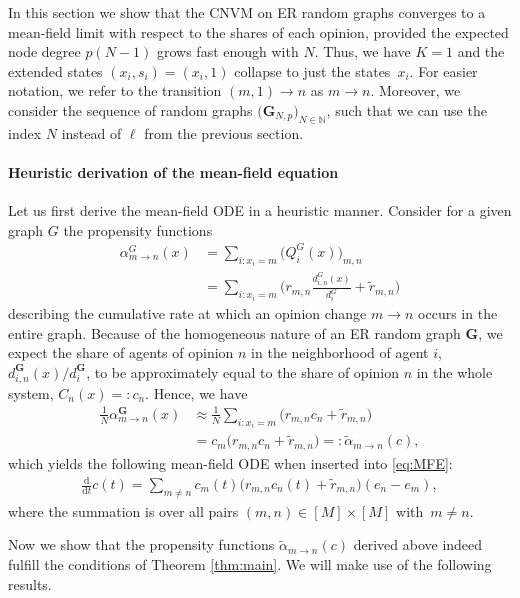 \documentclass[a4paper,
               10pt,
               pdftex,
               normalheadings,
               headsepline,
               footsepline,
               headinclude,
               footinclude,
               DIV=14,
               abstracton]
{scrartcl}
\newcommand{\rv}[1]{\bm{#1}}
\newcommand{\diff}{\mathrm{d}}
\newcommand{\review}[1]{{#1}}
\begin{document}
In this section we show that the CNVM on ER random graphs converges to a mean-field limit with respect to the shares of each opinion, provided the expected node degree $p(N-1)$ grows fast enough with $N$.
Thus, we have $K=1$ and the extended states $(x_i, s_i) = (x_i, 1)$ collapse to just the states~$x_i$.
For easier notation, we refer to the transition $(m, 1) \to n$ as $m \to n$.
Moreover, we consider the sequence of random graphs $\big(\rv{G}_{N,p}\big)_{N\in\mathbb{N}}$, such that we can use the index $N$ instead of $\ell$ from the previous section.

\paragraph{Heuristic derivation of the mean-field equation}
Let us first derive the mean-field ODE in a heuristic manner. Consider for a given graph $G$ the propensity functions
\begin{align}
    \alpha^{G}_{m\to n}(x) &= \sum_{i: x_i = m} \big(Q_i^{{G}}(x)\big)_{m, n} \\
    &= \sum_{i: x_i = m} \Big( r_{m, n}  \frac{d_{i,n}^{G}(x)}{d_{i}^{G}} + \tilde{r}_{m,n} \Big)\label{eq:cnvm_propensity}
\end{align}
\review{describing the cumulative rate at which an opinion change $m\to n$ occurs in the entire graph.}
Because of the homogeneous nature of an ER random graph $\rv{G}$, we expect the share of agents of opinion $n$ in the neighborhood of agent $i$, $d_{i,n}^{\rv{G}}(x) / d_{i}^{\rv{G}}$, to be approximately equal to the share of opinion $n$ in the whole system, $C_n(x) =: c_n$.
Hence, we have
\begin{align}
    \frac{1}{N} \alpha^{\rv{G}}_{m\to n}(x) &\approx \frac{1}{N} \sum_{i: x_i = m} \Big( r_{m, n} c_n + \tilde{r}_{m,n} \Big)  \\
    &= c_m \big(r_{m, n} c_n +  \tilde{r}_{m,n} \big) =: \tilde{\alpha}_{m\to n}(c), \label{eq:cnvm_reduced_propensity}
\end{align}
which yields the following mean-field ODE when inserted into \eqref{eq:MFE}:
\begin{align} \label{eq:MFE_ER}
    \frac{\diff}{\diff t} c(t) = \sum_{m \neq n} c_m(t) \big(r_{m, n} c_n(t) +  \tilde{r}_{m,n} \big) (e_n - e_m),
\end{align}
\review{where the summation is over all pairs $(m,n) \in [M] \times [M]$ with~$m\neq n$.}

Now we show that the propensity functions $\tilde{\alpha}_{m\to n}(c)$ derived above indeed fulfill the conditions of Theorem \ref{thm:main}. We will make use of the following results.
\end{document}
